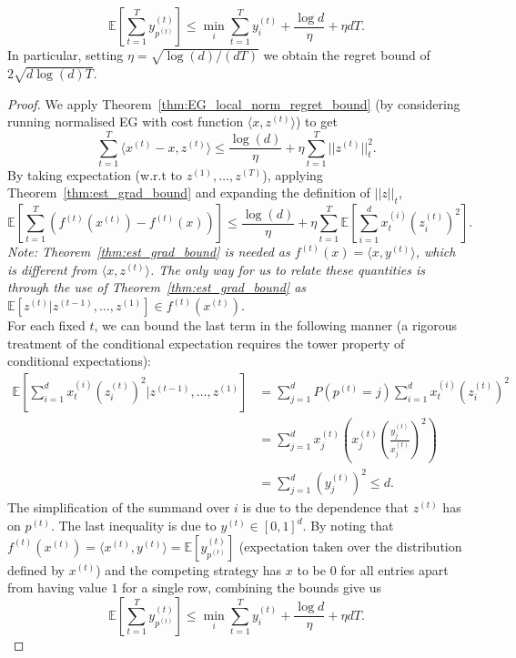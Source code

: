 \begin{theorem}
$$
\mathbb{E}\left[\sum_{t=1}^{T} y^{(t)}_{p^{(t)}}\right]
\leq \min_i \sum_{t=1}^{T} y^{(t)}_i + \frac{\log d}{\eta} + \eta d T.
$$
In particular, setting $\eta = \sqrt{\log(d)/(dT)}$ we obtain the regret bound of
$2\sqrt{d \log(d) T}$.
\end{theorem}
\begin{proof}
    We apply Theorem~\ref{thm:EG_local_norm_regret_bound} (by considering running normalised EG with cost function $\langle x, z^{(t)} \rangle$) to get
    $$
    \sum_{t=1}^T \langle x^{(t)} - x, z^{(t)} \rangle
    \leq \frac{\log(d)}{\eta} + \eta \sum_{t=1}^T ||z^{(t)}||^2_t.
    $$
    By taking expectation (w.r.t to $z^{(1)}, \dots, z^{(T)}$), applying Theorem~\ref{thm:est_grad_bound} and expanding the definition of $||z||_t$,
    $$
    \mathbb{E}\left[ \sum_{t=1}^{T} \left( f^{(t)}(x^{(t)}) - f^{(t)}(x) \right) \right] \leq \frac{\log(d)}{\eta} + \eta \sum_{t=1}^T \mathbb{E}\left[ \sum_{i=1}^d x^{(i)}_t (z^{(t)}_i)^2\right].
    $$
    \textit{Note: Theorem~\ref{thm:est_grad_bound} is needed as $f^{(t)}(x) = \langle x, y^{(t)}\rangle$, which is different from $\langle x, z^{(t)}\rangle$. The only way for us to relate these quantities is through the use of Theorem~\ref{thm:est_grad_bound} as $\mathbb{E}[z^{(t)}|z^{(t-1)}, \dots, z^{(1)}] \in f^{(t)}(x^{(t)})$}.\\
    \noindent For each fixed $t$, we can bound the last term in the following manner (a rigorous treatment of the conditional expectation requires the tower property of conditional expectations):
    \begin{align*}
        \mathbb{E}\left[ \sum_{i=1}^d x^{(i)}_t (z^{(t)}_i)^2 | z^{(t-1)}, \dots, z^{(1)}\right]
        &= \sum_{j=1}^d P(p^{(t)} = j) \sum_{i=1}^d x^{(i)}_t (z^{(t)}_i)^2 \\
        &= \sum_{j=1}^d x^{(t)}_j \left( x^{(t)}_j \left(\frac{y^{(t)}_j}{x^{(t)}_j}\right)^2 \right) \\
        &= \sum_{j=1}^d \left( y^{(t)}_j \right)^2 \leq d.
    \end{align*}
    The simplification of the summand over $i$ is due to the dependence that $z^{(t)}$ has on $p^{(t)}$. The last inequality is due to $y^{(t)} \in [0, 1]^d$.
    By noting that $f^{(t)}(x^{(t)}) = \langle x^{(t)}, y^{(t)} \rangle = \mathbb{E}[y^{(t)}_{p^{(t)}}]$ (expectation taken over the distribution defined by $x^{(t)}$) and the competing strategy has $x$ to be $0$ for all entries apart from having value $1$ for a single row, combining the bounds give us
    $$
    \mathbb{E}\left[\sum_{t=1}^{T} y^{(t)}_{p^{(t)}}\right]
    \leq \min_i \sum_{t=1}^{T} y^{(t)}_i + \frac{\log d}{\eta} + \eta d T.
    $$
\end{proof}

